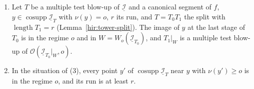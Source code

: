 \begin{lemma}
\begin{enumerate}
\item Let \(T\) be a multiple test blow-up of \(\underline{\mathcal I}\) and a canonical segment of \(f\), \(y\in\operatorname{cosupp}\underline{\mathcal I}_T\) with
\(\nu(y)=o\), \(r\) its run, and \(T=T_0T_1\) the split with \(\operatorname{length}T_1=r\) (Lemma~\ref{hir:tower-split}). The image of \(y\) at the last stage of
\(T_0\) is in the regime \(o\) and in \(W=W_o(\underline{\mathcal I}_{T_0})\), and \(T_1|_W\) is a multiple test blow-up of \(\mathcal O(\underline{\mathcal I}_{T_0}|_W,o)\).
\item In the situation of (3), every point \(y'\) of \(\operatorname{cosupp}\underline{\mathcal I}_T\) near \(y\) with \(\nu(y')\ge o\) is in the regime \(o\), and its run is at
least \(r\).
\end{enumerate}
\end{lemma}
